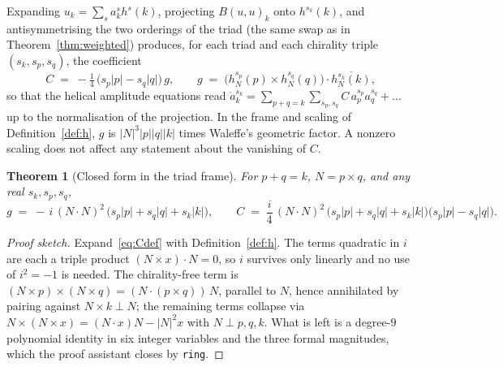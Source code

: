\documentclass[11pt]{amsart}
\theoremstyle{plain}
\newtheorem{theorem}{Theorem}[section]
\theoremstyle{definition}
\theoremstyle{remark}
\begin{document}
Expanding $u_k = \sum_s a^s_k h^s(k)$, projecting $B(u,u)_k$ onto $h^{s_k}(k)$, and antisymmetrising
the two orderings of the triad (the same swap as in Theorem~\ref{thm:weighted}) produces, for each
triad and each chirality triple $(s_k, s_p, s_q)$, the coefficient
\begin{equation}
  \label{eq:Cdef}
  C \;=\; -\tfrac14\,\bigl(s_p|p| - s_q|q|\bigr)\, g, \qquad
  g \;=\; \bigl(h^{s_p}_N(p) \times h^{s_q}_N(q)\bigr)\cdot \overline{h^{s_k}_N(k)},
\end{equation}
so that the helical amplitude equations read $\dot a^{s_k}_k = \sum_{p+q=k}\sum_{s_p,s_q} C\,
a^{s_p}_p a^{s_q}_q + \dots$ up to the normalisation of the projection. In the frame and scaling of
Definition~\ref{def:h}, $g$ is $|N|^3|p||q||k|$ times Waleffe's geometric factor. A nonzero scaling
does not affect any statement about the vanishing of $C$.

\begin{theorem}[Closed form in the triad frame]
\label{thm:coeff}
For $p + q = k$, $N = p \times q$, and any real $s_k, s_p, s_q$,
\begin{equation}
  \label{eq:closed}
  g \;=\; -\,i\,(N\cdot N)^2\,\bigl(s_p|p| + s_q|q| + s_k|k|\bigr), \qquad
  C \;=\; \frac{i}{4}\,(N\cdot N)^2\,\bigl(s_p|p| + s_q|q| + s_k|k|\bigr)\bigl(s_p|p| - s_q|q|\bigr).
\end{equation}
\end{theorem}

\begin{proof}[Proof sketch]
Expand~\eqref{eq:Cdef} with Definition~\ref{def:h}. The terms quadratic in $i$ are each a triple
product $(N \times x)\cdot N = 0$, so $i$ survives only linearly and no use of $i^2 = -1$ is
needed. The chirality-free term is $(N \times p) \times (N \times q) = (N \cdot (p\times q))\,N$,
parallel to $N$, hence annihilated by pairing against $N \times k \perp N$; the remaining terms
collapse via $N \times (N \times x) = (N\cdot x)N - |N|^2 x$ with $N \perp p, q, k$. What is left
is a degree-$9$ polynomial identity in six integer variables and the three formal magnitudes,
which the proof assistant closes by \texttt{ring}.
\end{proof}
\end{document}
